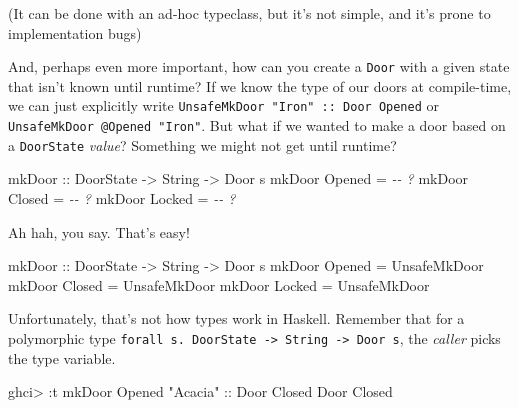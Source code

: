 \documentclass[]{article}
\newenvironment{Shaded}{}{}
\newcommand{\CommentTok}[1]{\textcolor[rgb]{0.38,0.63,0.69}{\textit{#1}}}
\newcommand{\DataTypeTok}[1]{\textcolor[rgb]{0.56,0.13,0.00}{#1}}
\newcommand{\NormalTok}[1]{#1}
\newcommand{\OperatorTok}[1]{\textcolor[rgb]{0.40,0.40,0.40}{#1}}
\newcommand{\OtherTok}[1]{\textcolor[rgb]{0.00,0.44,0.13}{#1}}
\newcommand{\StringTok}[1]{\textcolor[rgb]{0.25,0.44,0.63}{#1}}
\begin{document}
(It can be done with an ad-hoc typeclass, but it's not simple, and it's prone to
implementation bugs)

And, perhaps even more important, how can you create a \texttt{Door} with a
given state that isn't known until runtime? If we know the type of our doors at
compile-time, we can just explicitly write
\texttt{UnsafeMkDoor\ "Iron"\ ::\ Door\ \textquotesingle{}Opened} or
\texttt{UnsafeMkDoor\ @\textquotesingle{}Opened\ "Iron"}. But what if we wanted
to make a door based on a \texttt{DoorState} \emph{value}? Something we might
not get until runtime?

\begin{Shaded}
\begin{Highlighting}[]
\OtherTok{mkDoor ::} \DataTypeTok{DoorState} \OtherTok{{-}\textgreater{}} \DataTypeTok{String} \OtherTok{{-}\textgreater{}} \DataTypeTok{Door}\NormalTok{ s}
\NormalTok{mkDoor }\DataTypeTok{Opened} \OtherTok{=} \CommentTok{{-}{-} ?}
\NormalTok{mkDoor }\DataTypeTok{Closed} \OtherTok{=} \CommentTok{{-}{-} ?}
\NormalTok{mkDoor }\DataTypeTok{Locked} \OtherTok{=} \CommentTok{{-}{-} ?}
\end{Highlighting}
\end{Shaded}

Ah hah, you say. That's easy!

\begin{Shaded}
\begin{Highlighting}[]
\OtherTok{mkDoor ::} \DataTypeTok{DoorState} \OtherTok{{-}\textgreater{}} \DataTypeTok{String} \OtherTok{{-}\textgreater{}} \DataTypeTok{Door}\NormalTok{ s}
\NormalTok{mkDoor }\DataTypeTok{Opened} \OtherTok{=} \DataTypeTok{UnsafeMkDoor}
\NormalTok{mkDoor }\DataTypeTok{Closed} \OtherTok{=} \DataTypeTok{UnsafeMkDoor}
\NormalTok{mkDoor }\DataTypeTok{Locked} \OtherTok{=} \DataTypeTok{UnsafeMkDoor}
\end{Highlighting}
\end{Shaded}

Unfortunately, that's not how types work in Haskell. Remember that for a
polymorphic type
\texttt{forall\ s.\ DoorState\ -\textgreater{}\ String\ -\textgreater{}\ Door\ s},
the \emph{caller} picks the type variable.

\begin{Shaded}
\begin{Highlighting}[]
\NormalTok{ghci}\OperatorTok{\textgreater{}} \OperatorTok{:}\NormalTok{t mkDoor }\DataTypeTok{Opened} \StringTok{"Acacia"}\OtherTok{ ::} \DataTypeTok{Door} \DataTypeTok{\textquotesingle{}Closed}
\DataTypeTok{Door} \DataTypeTok{\textquotesingle{}Closed}
\end{Highlighting}
\end{Shaded}
\end{document}
